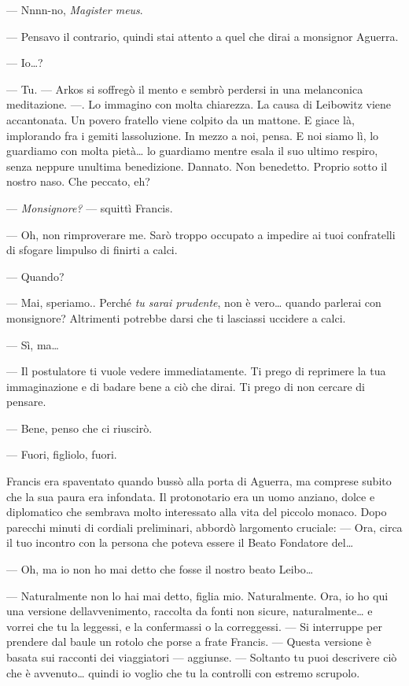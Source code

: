 --- Nnnn-no, \emph{Magister meus}.

--- Pensavo il contrario, quindi stai attento a quel che dirai a
monsignor Aguerra.

--- Io\ldots?

--- Tu. --- Arkos si soffregò il mento e sembrò perdersi in una
melanconica meditazione. ---. Lo immagino con molta chiarezza. La causa
di Leibowitz viene accantonata. Un povero fratello viene colpito da un
mattone. E giace là, implorando fra i gemiti
l\textquotesingle assoluzione. In mezzo a noi, pensa. E noi siamo lì, lo
guardiamo con molta pietà\ldots{} lo guardiamo mentre esala il suo
ultimo respiro, senza neppure un\textquotesingle ultima benedizione.
Dannato. Non benedetto. Proprio sotto il nostro naso. Che peccato, eh?

--- \emph{Monsignore?} --- squittì Francis.

--- Oh, non rimproverare me. Sarò troppo occupato a impedire ai tuoi
confratelli di sfogare l\textquotesingle impulso di finirti a calci.

--- Quando?

--- Mai, speriamo.. Perché \emph{tu sarai prudente}, non è vero\ldots{}
quando parlerai con monsignore? Altrimenti potrebbe darsi che ti
lasciassi uccidere a calci.

--- Sì, ma\ldots{}

--- Il postulatore ti vuole vedere immediatamente. Ti prego di reprimere
la tua immaginazione e di badare bene a ciò che dirai. Ti prego di non
cercare di pensare.

--- Bene, penso che ci riuscirò.

--- Fuori, figliolo, fuori.

Francis era spaventato quando bussò alla porta di Aguerra, ma comprese
subito che la sua paura era infondata. Il protonotario era un uomo
anziano, dolce e diplomatico che sembrava molto interessato alla vita
del piccolo monaco. Dopo parecchi minuti di cordiali preliminari,
abbordò l\textquotesingle argomento cruciale: --- Ora, circa il tuo
incontro con la persona che poteva essere il Beato Fondatore del\ldots{}

--- Oh, ma io non ho mai detto che fosse il nostro beato Leibo\ldots{}

--- Naturalmente non lo hai mai detto, figlia mio. Naturalmente. Ora, io
ho qui una versione dell\textquotesingle avvenimento, raccolta da fonti
non sicure, naturalmente\ldots{} e vorrei che tu la leggessi, e la
confermassi o la correggessi. --- Si interruppe per prendere dal baule
un rotolo che porse a frate Francis. --- Questa versione è basata sui
racconti dei viaggiatori --- aggiunse. --- Soltanto tu puoi descrivere
ciò che è avvenuto\ldots{} quindi io voglio che tu la controlli con
estremo scrupolo.


